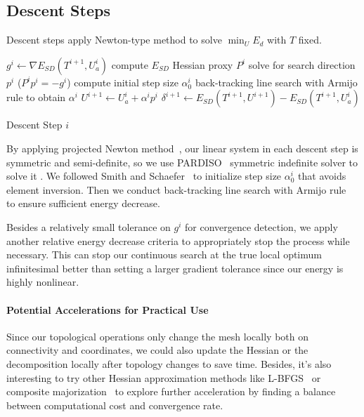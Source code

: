 
\subsection{Descent Steps}
\label{sec:descentStep}

Descent steps apply Newton-type method to solve $\min_U E_d$ with $T$ fixed.

\begin{algorithm}[h]
\SetAlgoLined
{}
$g^{i} \leftarrow \nabla E_{SD}(T^{i+1}, U_a^{i})$\;
compute $E_{SD}$ Hessian proxy $P^i$\;
solve for search direction $p^i$ ($P^i p^i = -g^i$)\;
compute initial step size $\alpha^i_0$\;
back-tracking line search with Armijo rule to obtain $\alpha^i$\;
$U^{i+1} \leftarrow U_a^i + \alpha^i p^i$\;
$\delta^{i+1} \leftarrow E_{SD}(T^{i+1}, U^{i+1}) - E_{SD}(T^{i+1}, U_a^{i})$\;
\caption{Descent Step $i$}
\label{alg:descentStep}
\end{algorithm}
By applying projected Newton method~\cite{Teran2005Robust}, our linear system in each descent step is symmetric and semi-definite, so we use PARDISO~\cite{pardiso-6.0a, pardiso-6.0b} symmetric indefinite solver to solve it . We followed Smith and Schaefer~ to initialize step size $\alpha^i_0$ that avoids element inversion. Then we conduct back-tracking line search with Armijo rule~\cite{Armijo1966Minimization} to ensure sufficient energy decrease.

Besides a relatively small tolerance on $g^i$ for convergence detection, we apply another relative energy decrease criteria to appropriately stop the process while necessary.
This can stop our continuous search at the true local optimum infinitesimal better than setting a larger gradient tolerance since our energy is highly nonlinear. 

\paragraph{Potential Accelerations for Practical Use}
Since our topological operations only change the mesh locally both on connectivity and coordinates, we could also update the Hessian or the decomposition locally after topology changes to save time. Besides, it's also interesting to try other Hessian approximation methods like L-BFGS~\cite{Liu1989Limited} or composite majorization~\cite{Shtengel2017Geometric} to explore further acceleration by finding a balance between computational cost and convergence rate.


